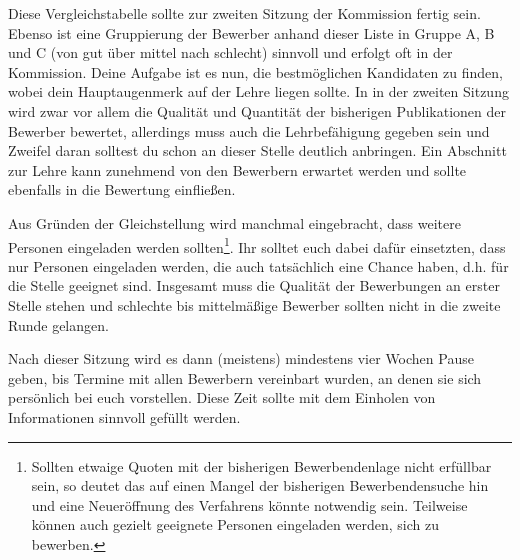 Diese Vergleichstabelle sollte zur zweiten Sitzung der Kommission fertig sein. Ebenso ist eine Gruppierung der Bewerber anhand dieser Liste in Gruppe A, B und C (von gut über mittel nach schlecht) sinnvoll und erfolgt oft in der Kommission.
Deine Aufgabe ist es nun, die bestmöglichen Kandidaten zu finden, wobei dein Hauptaugenmerk auf der Lehre liegen sollte. 
In in der zweiten Sitzung wird zwar vor allem die Qualität und Quantität der bisherigen Publikationen der Bewerber bewertet, allerdings muss auch die Lehrbefähigung gegeben sein und Zweifel daran solltest du schon an dieser Stelle deutlich anbringen.
Ein Abschnitt zur Lehre kann zunehmend von den Bewerbern erwartet werden und sollte ebenfalls in die Bewertung einfließen.

Aus Gründen der Gleichstellung wird manchmal eingebracht, dass weitere Personen eingeladen werden sollten\footnote{Sollten etwaige Quoten mit der bisherigen Bewerbendenlage nicht erfüllbar sein, so deutet das auf einen Mangel der bisherigen Bewerbendensuche hin und eine Neueröffnung des Verfahrens könnte notwendig sein. Teilweise können auch gezielt geeignete Personen eingeladen werden, sich zu bewerben.}.
Ihr solltet euch dabei dafür einsetzten, dass nur Personen eingeladen werden, die auch tatsächlich eine Chance haben, d.h. für die Stelle geeignet sind.
Insgesamt muss die Qualität der Bewerbungen an erster Stelle stehen und schlechte bis mittelmäßige Bewerber sollten nicht in die zweite Runde gelangen.

Nach dieser Sitzung wird es dann (meistens) mindestens vier Wochen Pause geben, bis Termine mit allen Bewerbern vereinbart wurden, an denen sie sich persönlich bei euch vorstellen. Diese Zeit sollte mit dem Einholen von Informationen sinnvoll gefüllt werden.

